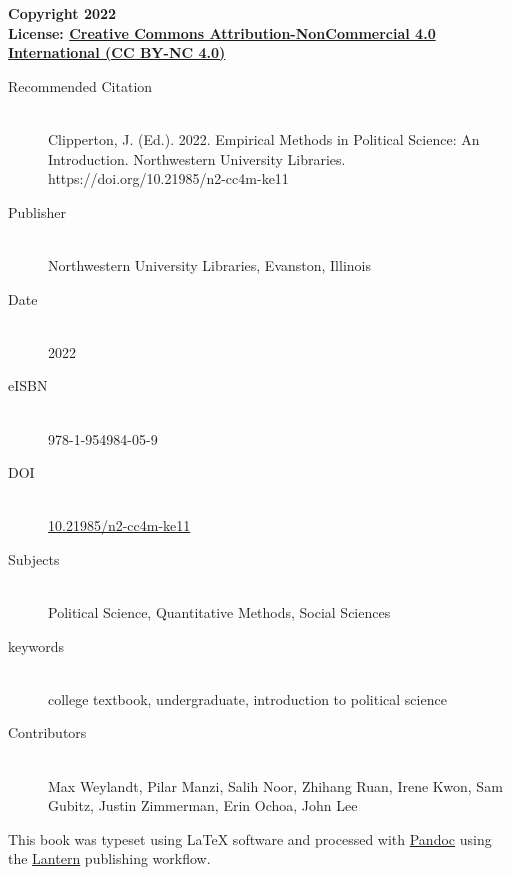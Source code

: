 \documentclass{book}
\newcommand{\booklicense}{\href{https://creativecommons.org/licenses/by-nc/4.0/}{Creative
Commons Attribution-NonCommercial 4.0 International (CC BY-NC 4.0)}}
\begin{document}
\begin{flushleft}

\textbf{Copyright \textcopyright{} 2022  \\
License: \booklicense}\\[11pt] 


\vspace*{\fill}

\begin{description}
  \item[Recommended Citation] \hfill \\ Clipperton, J. (Ed.). 2022. Empirical
Methods in Political Science: An Introduction. Northwestern University
Libraries. https://doi.org/10.21985/n2-cc4m-ke11
  \item[Publisher] \hfill \\ Northwestern University Libraries, Evanston,
Illinois
  \item[Date] \hfill \\ 2022
        \item[eISBN] \hfill \\ 978-1-954984-05-9
      \item[DOI] \hfill \\ \href{https://doi.org/10.21985/n2-cc4m-ke11}{10.21985/n2-cc4m-ke11}
    \item[Subjects] \hfill \\ Political Science, Quantitative Methods, Social
Sciences
  \item[keywords] \hfill \\ college textbook, undergraduate, introduction to
political science
    \item[Contributors] \hfill \\ Max Weylandt, Pilar Manzi, Salih
Noor, Zhihang Ruan, Irene Kwon, Sam Gubitz, Justin Zimmerman, Erin Ochoa, John
Lee
  
\end{description}


\vspace*{\fill}

This book was typeset using \LaTeX{} software and processed with \href{https://pandoc.org}{Pandoc} using the \href{http://lantern.northwestern.pub}{Lantern} publishing workflow.\\

\end{flushleft}

\addtocounter{page}{2}
\end{document}
